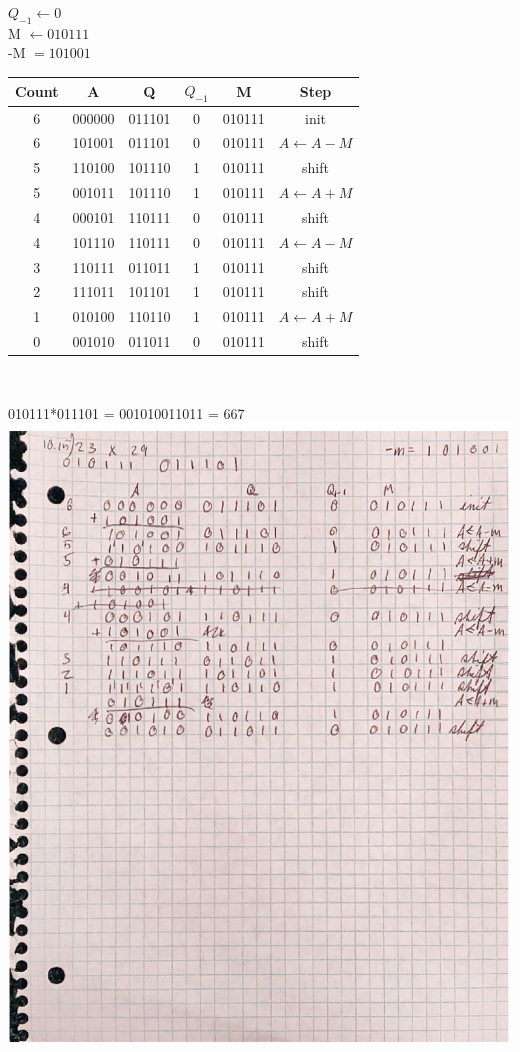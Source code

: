 \documentclass[12pt,largemargins]{homework}
\begin{document}
$Q_{-1} \leftarrow 0$\\
M $\leftarrow 010111$\\
-M $=101001$\\
\begin{center}
\begin{tabular}{|c|c|c|c|c|c|}
\hline
Count & A & Q & $Q_{-1}$ & M & Step\\
\hline
6 & 000000 & 011101 & 0 & 010111 & init\\
\hline
6 & 101001 & 011101 & 0 & 010111 & $A\leftarrow A - M$\\
\hline
5 & 110100 & 101110 & 1 & 010111 & shift\\
\hline 
5 & 001011 & 101110 & 1 & 010111 & $A\leftarrow A + M $\\
\hline 
4 & 000101 & 110111 & 0 & 010111 & shift\\
\hline
4 & 101110 & 110111 & 0 & 010111 & $A\leftarrow A-M$\\
\hline
3 & 110111 & 011011 & 1 & 010111 & shift\\
\hline 
2 & 111011 & 101101 & 1 & 010111 & shift\\
\hline 
1 & 010100 & 110110 & 1 & 010111 & $A\leftarrow A + M$\\
\hline 
0 & 001010 & 011011 & 0 & 010111 & shift\\
\hline
\end{tabular}\\
\end{center}
010111*011101 = 001010011011 = 667\\
\includegraphics[scale=.25, angle=90]{homework1_10-15work}
\end{document}
